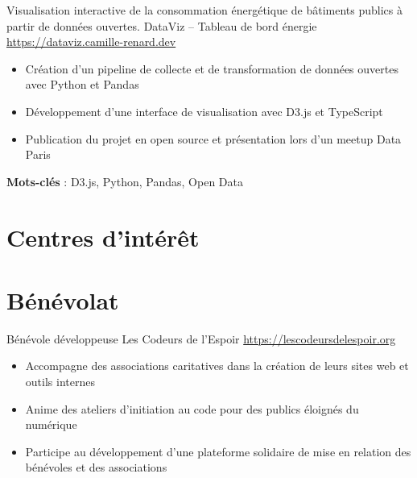 \documentclass[a4paper, serif, 10pt]{moderncv}
\begin{document}
        {Visualisation interactive de la consommation énergétique de bâtiments publics à partir de données ouvertes.}
        {DataViz – Tableau de bord énergie}
        {\url{https://dataviz.camille-renard.dev}}
        {}
        {\begin{itemize}
\item Création d’un pipeline de collecte et de transformation de données ouvertes avec Python et Pandas
\item Développement d’une interface de visualisation avec D3.js et TypeScript
\item Publication du projet en open source et présentation lors d’un meetup Data Paris
\end{itemize}
\textbf{Mots-clés} : D3.js, Python, Pandas, Open Data}
\section{Centres d'intérêt}

\section{Bénévolat}

        {Bénévole développeuse}
        {Les Codeurs de l’Espoir}
        {\url{https://lescodeursdelespoir.org}}
        {}
        {\begin{itemize}
\item Accompagne des associations caritatives dans la création de leurs sites web et outils internes
\item Anime des ateliers d’initiation au code pour des publics éloignés du numérique
\item Participe au développement d’une plateforme solidaire de mise en relation des bénévoles et des associations
\end{itemize}}
\end{document}
